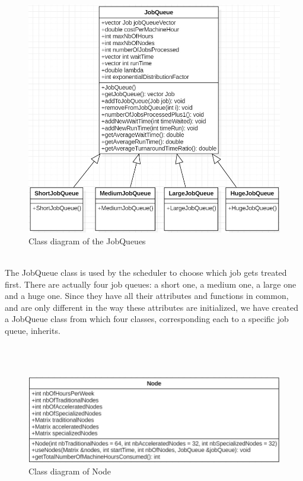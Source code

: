 \documentclass [10 pt, a4 paper]{report}
\begin{document}
\begin{figure}[!htbp]
\centering
\includegraphics[width=\textwidth]{JobQueues.jpg}
\caption{\label{fig:image} Class diagram of the JobQueues}
\end{figure}
\\
\clearpage
\noindent
The JobQueue class is used by the scheduler to choose which job gets treated first. There are actually four job queues: a short one, a medium one, a large one and a huge one. Since they have all their attributes and functions in common, and are only different in the way these attributes are initialized, we have created a JobQueue class from which four classes, corresponding each to a specific job queue, inherits.

\\ \\

\begin{figure}[!htbp]
\centering
\includegraphics[width=1.2\textwidth]{Node.jpg}
\caption{\label{fig:image} Class diagram of Node}
\end{figure}
\\
\end{document}
